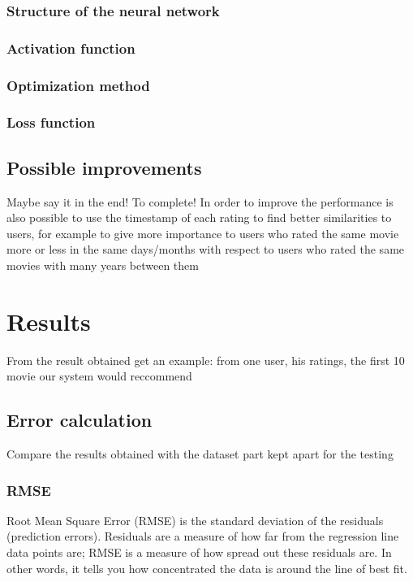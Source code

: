 \documentclass{article}
\begin{document}
\subsubsection{Structure of the neural network}

\subsubsection{Activation function}

\subsubsection{Optimization method}

\subsubsection{Loss function}

\subsection{Possible improvements}
Maybe say it in the end! To complete!
In order to improve the performance is also possible to use the timestamp of each rating to find better similarities to users, for example to give more importance to users who rated the same movie more or less in the same days/months with respect to users who rated the same movies with many years between them



\newpage

\section{Results}
From the result obtained get an example: from one user, his ratings, the first 10 movie our system would reccommend

\subsection{Error calculation}
Compare the results obtained with the dataset part kept apart for the testing

\subsubsection{RMSE}

Root Mean Square Error (RMSE) is the standard deviation of the residuals (prediction errors). Residuals are a measure of how far from the regression line data points are; RMSE is a measure of how spread out these residuals are. In other words, it tells you how concentrated the data is around the line of best fit. 
\end{document}
